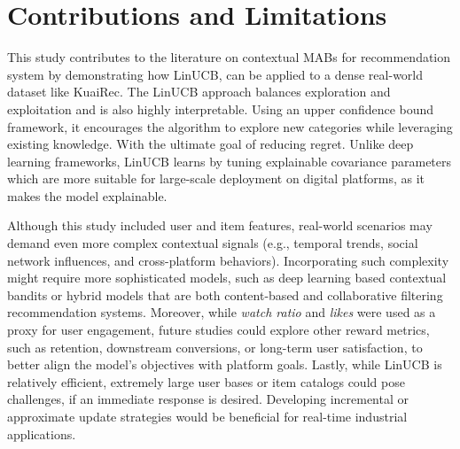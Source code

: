 \section{Contributions and Limitations}

This study contributes to the literature on contextual MABs for recommendation system by demonstrating how LinUCB, can be applied to a dense real-world dataset like KuaiRec. The LinUCB approach balances exploration and exploitation and is also highly interpretable. Using an upper confidence bound framework, it encourages the algorithm to explore new categories while leveraging existing knowledge. With the ultimate goal of reducing regret. Unlike deep learning frameworks, LinUCB learns by tuning explainable covariance parameters which are more suitable for large-scale deployment on digital platforms, as it makes the model explainable.

Although this study included user and item features, real-world scenarios may demand even more complex contextual signals (e.g., temporal trends, social network influences, and cross-platform behaviors). Incorporating such complexity might require more sophisticated models, such as deep learning based contextual bandits or hybrid models that are both content-based and collaborative filtering recommendation systems. Moreover, while \textit{watch ratio} and \textit{likes} were used as a proxy for user engagement, future studies could explore other reward metrics, such as retention, downstream conversions, or long-term user satisfaction, to better align the model’s objectives with platform goals. Lastly, while LinUCB is relatively efficient, extremely large user bases or item catalogs could pose challenges, if an immediate response is desired. Developing incremental or approximate update strategies would be beneficial for real-time industrial applications. 
